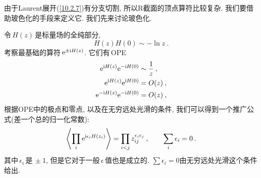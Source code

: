 由于Laurent展开(\ref{10.2.7})有分支切割, 所以R截面的顶点算符比较复杂. 我们要借助玻色化的手段来定义它. 我们先来讨论玻色化.

令$\,H(z)\,$是标量场的全纯部分,
\begin{equation}
    H(z)H(0)\sim -\ln z \:. \label{10.3.5}
\end{equation}
考察最基础的算符$\,\mathrm{e}^{\pm\mathrm{i} H(z)}$. 它们有\,OPE
\begin{subequations}
\begin{align}
    \mathrm{e}^{\mathrm{i} H(z)}\mathrm{e}^{-\mathrm{i} H(0)}&\sim \frac{1}{z} \:, \label{10.3.6a} \\
    \mathrm{e}^{\mathrm{i} H(z)}\mathrm{e}^{\mathrm{i} H(0)} &= O(z) \:, \label{10.3.6b} \\
    \mathrm{e}^{-\mathrm{i} H(z)}\mathrm{e}^{-\mathrm{i} H(0)}&= O(z) \:, \label{10.3.6c}
\end{align} \label{10.3.6}
\end{subequations}
根据OPE中的极点和零点, 以及在无穷远处光滑的条件, 我们可以得到一个推广公式(差一个总的归一化常数):
\begin{equation}
    \left\langle \prod_{i}\mathrm{e}^{\mathrm{i}\epsilon_{i}H(z_{i})}\right\rangle
    =\prod_{i<j} z_{ij}^{\epsilon_{i}\epsilon_{j}} \:, \qquad \sum_{i}\epsilon_{i} = 0\:.\label{10.3.7}
\end{equation}
其中$\,\epsilon_{i}\,$是$\,\pm1$, 但是它对于一般$\,\epsilon\,$值也是成立的.  $\sum\epsilon_{i}=0$由无穷远处光滑这个条件给出.

